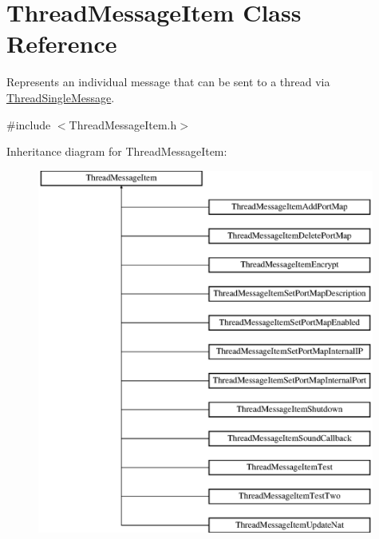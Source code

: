 \hypertarget{class_thread_message_item}{
\section{ThreadMessageItem Class Reference}
\label{class_thread_message_item}
}


Represents an individual message that can be sent to a thread via \hyperlink{class_thread_single_message}{ThreadSingleMessage}.  




{\ttfamily \#include $<$ThreadMessageItem.h$>$}

Inheritance diagram for ThreadMessageItem:\begin{figure}[H]
\begin{center}
\leavevmode
\includegraphics[height=12.000000cm]{class_thread_message_item}
\end{center}
\end{figure}
